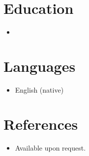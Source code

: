 \documentclass[11pt,a4paper,sans]{moderncv}
\begin{document}
\section{Education}
\vspace{1pt}
\begin{itemize}
\item{}
\end{itemize}

\section{Languages}
\vspace{1pt}
\begin{itemize}
\item English (native)
\end{itemize}

\section{References}
\vspace{1pt}
\begin{itemize}
\item{Available upon request.}
\end{itemize}
\end{document}
